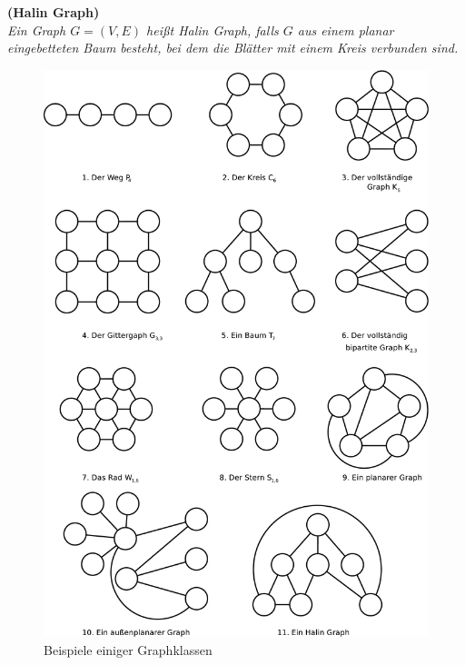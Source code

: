 \begin{defi}{\textbf{(Halin Graph)}}\\
\emph{Ein Graph $G = (V, E)$ heißt Halin Graph, falls $G$ aus einem planar eingebetteten Baum besteht, bei dem die Blätter mit einem Kreis verbunden sind.} 
\end{defi}
\begin{figure}[h!]
		\centering 		 
   \includegraphics[width=430pt]{bilder/graphs.pdf}
	\caption{Beispiele einiger Graphklassen}
  	 \end{figure}
\clearpage
